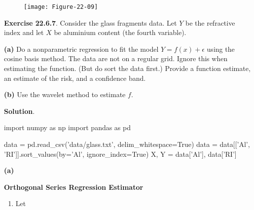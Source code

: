 
\begin{figure}[H]
\centering
\texttt{[image: Figure-22-09]}
\end{figure}

\textbf{Exercise 22.6.7}. Consider the glass fragments data. Let \(Y\)
be the refractive index and let \(X\) be aluminium content (the fourth
variable).

\textbf{(a)} Do a nonparametric regression to fit the model
\(Y = f(x) + \epsilon\) using the cosine basis method. The data are not
on a regular grid. Ignore this when estimating the function. (But do
sort the data first.) Provide a function estimate, an estimate of the
risk, and a confidence band.

\textbf{(b)} Use the wavelet method to estimate \(f\).

\textbf{Solution}.

\begin{python}
import numpy as np
import pandas as pd

data = pd.read_csv('data/glass.txt', delim_whitespace=True)
data = data[['Al', 'RI']].sort_values(by='Al', ignore_{i}ndex=True)
X, Y = data['Al'], data['RI']
\end{python}

\textbf{(a)}

\textbf{Orthogonal Series Regression Estimator}

\begin{enumerate}[tightlist,label={\arabic*.}]
\item
  Let
\end{enumerate}

